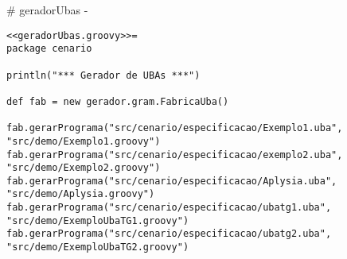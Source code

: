 # geradorUbas {-}

\begin{lstlisting}
<<geradorUbas.groovy>>=
package cenario

println("*** Gerador de UBAs ***")

def fab = new gerador.gram.FabricaUba()

fab.gerarPrograma("src/cenario/especificacao/Exemplo1.uba", "src/demo/Exemplo1.groovy")
fab.gerarPrograma("src/cenario/especificacao/exemplo2.uba", "src/demo/Exemplo2.groovy")
fab.gerarPrograma("src/cenario/especificacao/Aplysia.uba", "src/demo/Aplysia.groovy")
fab.gerarPrograma("src/cenario/especificacao/ubatg1.uba", "src/demo/ExemploUbaTG1.groovy")
fab.gerarPrograma("src/cenario/especificacao/ubatg2.uba", "src/demo/ExemploUbaTG2.groovy")

\end{lstlisting}

